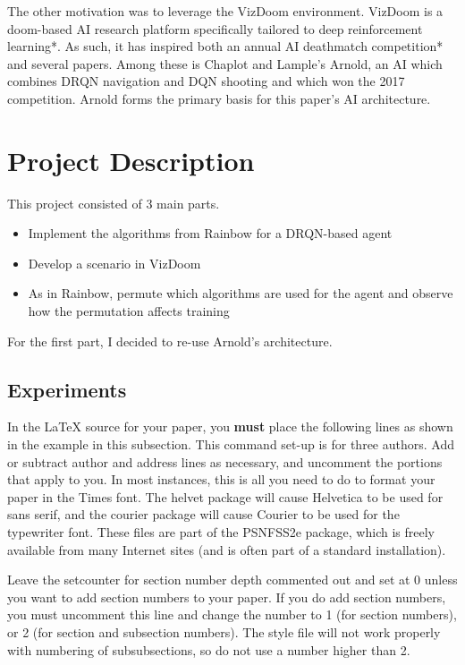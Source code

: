 \documentclass[letterpaper]{article}
\begin{document}
	The other motivation was to leverage the VizDoom environment. VizDoom is a doom-based AI research platform specifically tailored to deep reinforcement learning*. As such, it has inspired both an annual AI deathmatch competition* and several papers. Among these is Chaplot and Lample's Arnold, an AI which combines DRQN navigation and DQN shooting and which won the 2017 competition. Arnold forms the primary basis for this paper's AI architecture.
	
	\section{Project Description}
	
	This project consisted of 3 main parts.
	\begin{itemize}
		\item Implement the algorithms from Rainbow for a DRQN-based agent
		\item Develop a scenario in VizDoom 
		\item As in Rainbow, permute which algorithms are used for the agent and observe how the permutation affects training
	\end{itemize}

	For the first part, I decided to re-use Arnold's architecture. 
	
	\subsection{Experiments}
	
	In the \LaTeX{} source for your paper, you \textbf{must} place the following lines as shown in the example in this subsection. This command set-up is for three authors. Add or subtract author and address lines as necessary, and uncomment the portions that apply to you. In most instances, this is all you need to do to format your paper in the Times font. The helvet package will cause Helvetica to be used for sans serif, and the courier package will cause Courier to be used for the typewriter font. These files are part of the PSNFSS2e package, which is freely available from many Internet sites (and is often part of a standard installation).
	
	Leave the setcounter for section number depth commented out and set at 0 unless you want to add section numbers to your paper. If you do add section numbers, you must uncomment this line and change the number to 1 (for section numbers), or 2 (for section and subsection numbers). The style file will not work properly with numbering of subsubsections, so do not use a number higher than 2.
	
\end{document}
